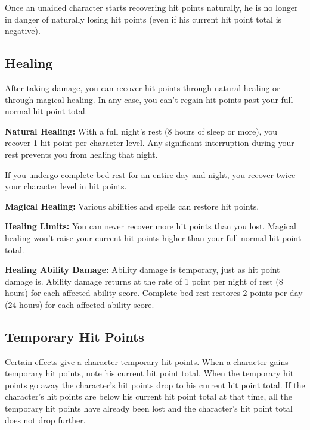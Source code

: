 Once an unaided character starts recovering hit points naturally, he is no longer 
in danger of naturally losing hit points (even if his current hit point total is 
negative).

\subsection{Healing}

After taking damage, you can recover hit points through natural healing or through 
magical healing. In any case, you can't regain hit points past your full normal 
hit point total.

\textbf{Natural Healing:} With a full night's rest (8 hours of sleep or more), 
you recover 1 hit point per character level. Any significant interruption during 
your rest prevents you from healing that night.

If you undergo complete bed rest for an entire day and night, you recover twice 
your character level in hit points. 

\textbf{Magical Healing:} Various abilities and spells can restore hit points.

\textbf{Healing Limits:} You can never recover more hit points than you lost. Magical 
healing won't raise your current hit points higher than your full normal hit point 
total.

\textbf{Healing Ability Damage:} Ability damage is temporary, just as hit point 
damage is. Ability damage returns at the rate of 1 point per night of rest (8 hours) 
for each affected ability score. Complete bed rest restores 2 points per day (24 
hours) for each affected ability score.

\subsection{Temporary Hit Points}

Certain effects give a character temporary hit points. When a character gains temporary 
hit points, note his current hit point total. When the temporary hit points go 
away the character's hit points drop to his current hit point total. If the character's 
hit points are below his current hit point total at that time, all the temporary 
hit points have already been lost and the character's hit point total does not 
drop further.

